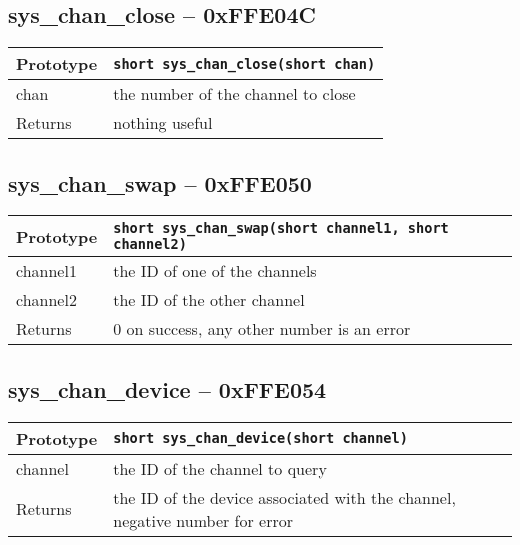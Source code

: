 \subsection*{sys\_chan\_close -- 0xFFE04C}
\begin{tabular}{|l||l|} \hline
Prototype & \lstinline!short sys_chan_close(short chan)! \\ \hline
chan & the number of the channel to close \\ \hline
Returns & nothing useful \\ \hline
\end{tabular}

\subsection*{sys\_chan\_swap -- 0xFFE050}
\begin{tabular}{|l||l|} \hline
Prototype & \lstinline!short sys_chan_swap(short channel1, short channel2)! \\ \hline
channel1 & the ID of one of the channels \\ \hline
channel2 & the ID of the other channel \\ \hline
Returns & 0 on success, any other number is an error \\ \hline
\end{tabular}

\subsection*{sys\_chan\_device -- 0xFFE054}
\begin{tabular}{|l||l|} \hline
Prototype & \lstinline!short sys_chan_device(short channel)! \\ \hline
channel & the ID of the channel to query \\ \hline
Returns & the ID of the device associated with the channel, negative number for error \\ \hline
\end{tabular}

